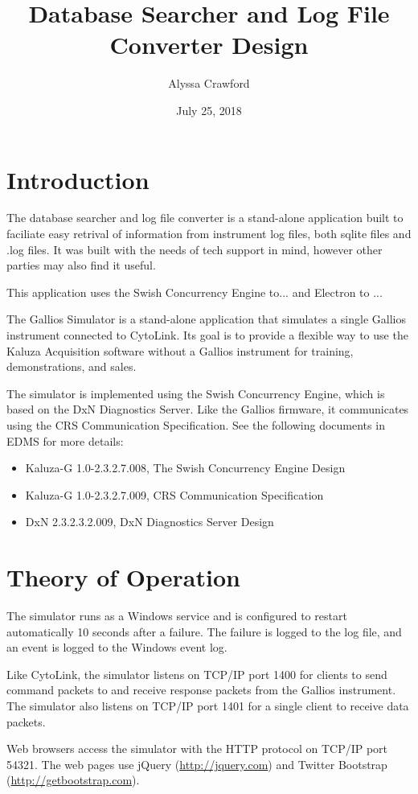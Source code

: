 \documentclass[letterpaper,11pt,twoside,final]{article}
\begin{document}
\title{Database Searcher and Log File Converter Design}
\author{Alyssa Crawford}
\date{July 25, 2018}
\coverpage

\section*{Introduction}
The database searcher and log file converter is a stand-alone
application built to faciliate easy retrival of information from instrument
log files, both sqlite files and .log files. It was built with the
needs of tech support in mind, however other parties may also find it
useful.

This application uses the Swish Concurrency Engine to... and Electron
to ...

The Gallios Simulator is a stand-alone application that simulates a
single Gallios instrument connected to CytoLink. Its goal is to
provide a flexible way to use the Kaluza Acquisition software without
a Gallios instrument for training, demonstrations, and sales.

The simulator is implemented using the Swish Concurrency Engine, which
is based on the DxN Diagnostics Server. Like the Gallios firmware, it
communicates using the CRS Communication Specification. See the
following documents in EDMS for more details:
\begin{itemize}
\item Kaluza-G 1.0-2.3.2.7.008, The Swish Concurrency Engine Design
\item Kaluza-G 1.0-2.3.2.7.009, CRS Communication Specification
\item DxN 2.3.2.3.2.009, DxN Diagnostics Server Design
\end{itemize}

\section*{Theory of Operation}

The simulator runs as a Windows service and is configured to restart
automatically 10 seconds after a failure. The failure is logged to the
log file, and an event is logged to the Windows event log.

Like CytoLink, the simulator listens on TCP/IP port 1400 for clients
to send command packets to and receive response packets from the
Gallios instrument. The simulator also listens on TCP/IP port 1401 for
a single client to receive data packets.

Web browsers access the simulator with the HTTP protocol on TCP/IP
port 54321. The web pages use jQuery (\url{http://jquery.com}) and
Twitter Bootstrap (\url{http://getbootstrap.com}).
\end{document}
